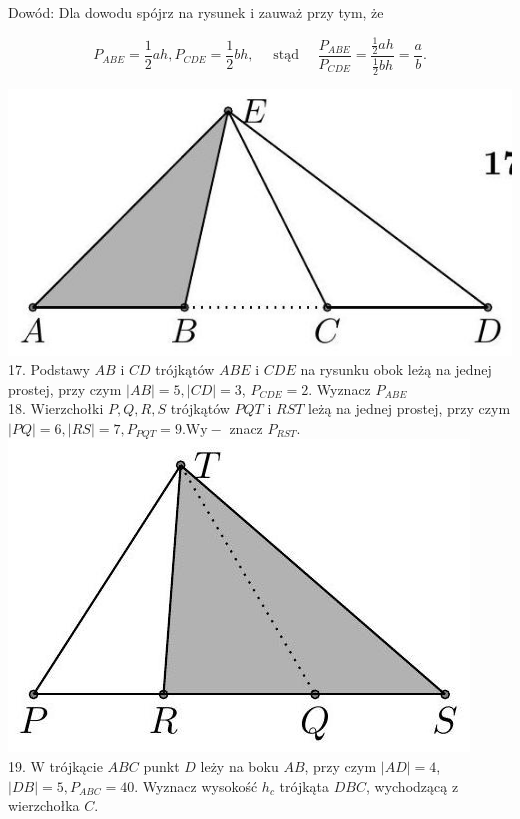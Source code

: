 \documentclass[10pt]{article}
\begin{document}
Dowód: Dla dowodu spójrz na rysunek i zauważ przy tym, że

\[
P_{A B E}=\frac{1}{2} a h, P_{C D E}=\frac{1}{2} b h, \quad \text { stąd } \quad \frac{P_{A B E}}{P_{C D E}}=\frac{\frac{1}{2} a h}{\frac{1}{2} b h}=\frac{a}{b} .
\]

\includegraphics[max width=\textwidth, center]{2024_11_21_71f62bd117d375398909g-034(2)}\\
17. Podstawy \(A B\) i \(C D\) trójkątów \(A B E\) i \(C D E\) na rysunku obok leżą na jednej prostej, przy czym \(|A B|=5,|C D|=3\), \(P_{C D E}=2\). Wyznacz \(P_{A B E}\)\\
18. Wierzchołki \(P, Q, R, S\) trójkątów \(P Q T\) i \(R S T\) leżą na jednej prostej, przy czym \(|P Q|=6,|R S|=7, P_{P Q T}=9 . \mathrm{Wy-}\) znacz \(P_{R S T}\).\\
\includegraphics[max width=\textwidth, center]{2024_11_21_71f62bd117d375398909g-035(3)}\\
19. W trójkącie \(A B C\) punkt \(D\) leży na boku \(A B\), przy czym \(|A D|=4\), \(|D B|=5, P_{A B C}=40\). Wyznacz wysokość \(h_{c}\) trójkąta \(D B C\), wychodzącą z wierzchołka \(C\).\\
\end{document}
